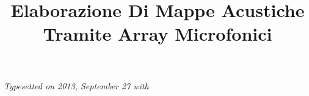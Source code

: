 \documentclass[a4paper,italian,12pt,oneside]{book}
\begin{document}
%
\setcounter{page}{1}
%
\title{Elaborazione Di Mappe Acustiche\\[2mm] Tramite Array Microfonici\\}
\providecommand{\autore}{LORENZO ROTTEGLIA}                        %
\providecommand{\principaladviser}{ANGELO FARINA}  %
\providecommand{\firstreader}{SIMONE CAMPANINI}            %
\providecommand{\annoacc}{2012--2013}
\providecommand{\corso}{\uppercase{Informatica}} %
\providecommand{\chiarmoprof}{Chiar.mo Prof.}
\providecommand{\dotting}{Dott. Ing.}
\providecommand{\dott}{Dott.}

\titlep

\pagestyle{fancy}
\renewcommand{\chaptermark}[1]{\markboth{{\chaptername}\ \thechapter.\hspace{1em}#1}{}}
\fancyhf{}
\fancyhead[RO,RE]{\nouppercase{\bfseries \thepage}}
\fancyhead[LO,LE]{\nouppercase{\bfseries \rightmark}}
\addtolength{\headwidth}{1cm}
\renewcommand{\footrulewidth}{0pt}
\lfoot{} \cfoot{} \rfoot{}


\thispagestyle{empty}


\newcommand{\ud}{\mathrm{d}}
\newcommand{\ue}{\mathrm{e}}
\newcommand{\um}{\textrm{m}}
\newcommand{\ums}{\textrm{ms}}
\newcommand{\ramsete}{\emph{Ramsete }}
\newcommand{\getir}{\emph{getIR }}
\newcommand{\eigen}{\emph{Eigenmike\textsuperscript{\texttrademark}}\;}
\newcommand{\audacity}{\emph{Audacity\textsuperscript{\textregistered}}\;}
       
%
\pagestyle{fancy}
%
\tableofcontents
\listoffigures 
\listoftables 
%
\clearpage
\normalsize
{}
\setcounter{page}{11}
       
      
      
      
      
      
      
      

\appendix
\renewcommand{\chaptermark}[1]{\markboth{{\appendixname}\ \thechapter.\hspace{1em}#1}{}}
      






    

\newpage

\vspace*{9cm}
\thispagestyle{empty}
\centering
\em
Typesetted on 2013, September 27 with \LaTeXe
\end{document}
